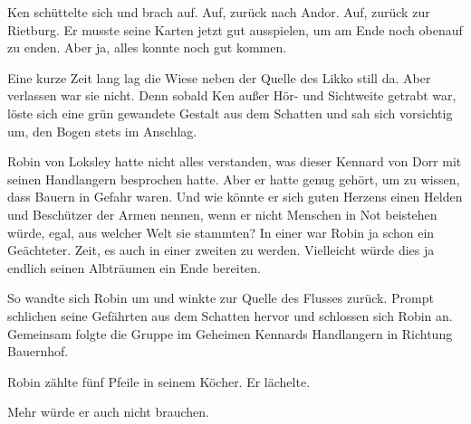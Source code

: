 Ken schüttelte sich und brach auf. Auf, zurück nach Andor. Auf, zurück zur Rietburg. Er musste seine Karten jetzt gut ausspielen, um am Ende noch obenauf zu enden. Aber ja, alles konnte noch gut kommen.



\trennzeichen



Eine kurze Zeit lang lag die Wiese neben der Quelle des Likko still da. Aber verlassen war sie nicht. Denn sobald Ken außer Hör- und Sichtweite getrabt war, löste sich eine grün gewandete Gestalt aus dem Schatten und sah sich vorsichtig um, den Bogen stets im Anschlag.

Robin von Loksley hatte nicht alles verstanden, was dieser Kennard von Dorr mit seinen Handlangern besprochen hatte. Aber er hatte genug gehört, um zu wissen, dass Bauern in Gefahr waren. Und wie könnte er sich guten Herzens einen Helden und Beschützer der Armen nennen, wenn er nicht Menschen in Not beistehen würde, egal, aus welcher Welt sie stammten? In einer war Robin ja schon ein Geächteter. Zeit, es auch in einer zweiten zu werden. Vielleicht würde dies ja endlich seinen Albträumen ein Ende bereiten.

So wandte sich Robin um und winkte zur Quelle des Flusses zurück. Prompt schlichen seine Gefährten aus dem Schatten hervor und schlossen sich Robin an. Gemeinsam folgte die Gruppe im Geheimen Kennards Handlangern in Richtung Bauernhof.

Robin zählte fünf Pfeile in seinem Köcher. Er lächelte.

Mehr würde er auch nicht brauchen.
